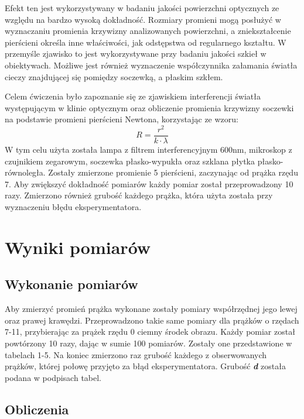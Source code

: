 \documentclass[polish, 11pt, a4paper]{article}
\begin{document}
		Efekt ten jest wykorzystywany w badaniu jakości powierzchni optycznych ze względu na bardzo wysoką dokładność. Rozmiary promieni mogą posłużyć w wyznaczaniu promienia krzywizny analizowanych powierzchni, a zniekształcenie pierścieni określa inne właściwości, jak odstępstwa od regularnego kształtu. W przemyśle zjawisko to jest wykorzystywane przy badaniu jakości szkieł w obiektywach.
		Możliwe jest również wyznaczenie współczynnika załamania światła cieczy znajdującej się pomiędzy soczewką, a płaskim szkłem.
		
		Celem ćwiczenia było zapoznanie się ze zjawiskiem interferencji światła występującym w klinie optycznym oraz obliczenie promienia krzywizny soczewki na podstawie promieni pierścieni Newtona, korzystając ze wzoru: 
		\begin{displaymath}
		R=\frac{r^2}{k\cdot \lambda}
		\end{displaymath}
		W tym celu użyta została lampa z filtrem interferencyjnym 600nm, mikroskop z czujnikiem zegarowym, soczewka płasko-wypukła oraz szklana płytka płasko-równoległa. Zostały zmierzone promienie 5 pierścieni, zaczynając od prążka rzędu 7. Aby zwiększyć dokładność pomiarów każdy pomiar został przeprowadzony 10 razy. Zmierzono również grubość każdego prążka, która użyta została przy wyznaczeniu błędu eksperymentatora.
		
	\newpage
	\section{Wyniki pomiarów}
	
	\subsection{Wykonanie pomiarów}
		Aby zmierzyć promień prążka wykonane zostały pomiary współrzędnej jego lewej oraz prawej krawędzi. Przeprowadzono takie same pomiary dla prążków o rzędach 7-11, przybierając za prążek rzędu 0 ciemny środek obrazu. Każdy pomiar został powtórzony 10 razy, dając w sumie 100 pomiarów. Zostały one przedstawione w tabelach 1-5. Na koniec zmierzono raz grubość każdego z obserwowanych prążków, której połowę przyjęto za błąd eksperymentatora. Grubość \textbf{\textit{d}} została podana w podpisach tabel.
	\subsection{Obliczenia}
\end{document}
